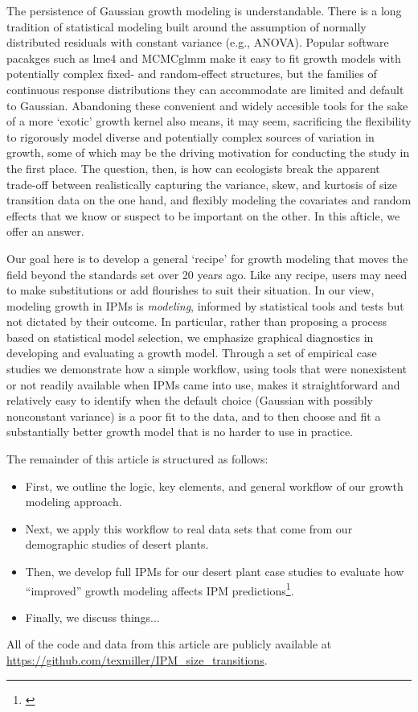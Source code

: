 \documentclass[11pt]{article}
\newcommand{\tom}[2]{{\color{red}{#1}}\footnote{\textit{\color{red}{#2}}}}
\begin{document}
{The persistence of Gaussian growth modeling is understandable. 
There is a long tradition of statistical modeling built around the assumption of normally distributed residuals with constant variance (e.g., ANOVA).
Popular software pacakges such as lme4 \citep{bates2007lme4} and MCMCglmm \citep{hadfield2010mcmc} make it easy to fit growth models with potentially complex fixed- and random-effect structures, but the families of continuous response distributions they can accommodate are limited and default to Gaussian.
Abandoning these convenient and widely accesible tools for the sake of a more `exotic' growth kernel also means, it may seem, sacrificing the flexibility to rigorously model diverse and potentially complex sources of variation in growth, some of which may be the driving motivation for conducting the study in the first place.
The question, then, is how can ecologists break the apparent trade-off between realistically capturing the variance, skew, and kurtosis of size transition data on the one hand, and flexibly modeling the covariates and random effects that we know or suspect to be important on the other. 
In this afticle, we offer an answer. 

Our goal here is to develop a general `recipe' for growth modeling that moves the field beyond the standards set over 20 years ago.
Like any recipe, users may need to make substitutions or add flourishes to suit their situation. 
In our view, modeling growth in IPMs is \emph{modeling}, informed by statistical tools and tests but not dictated by their outcome. 
In particular, rather than proposing a process based on statistical model selection, we emphasize graphical diagnostics in developing and 
evaluating a growth model. Through a set of empirical case studies we demonstrate how a simple workflow, using tools 
that were nonexistent or not readily available when IPMs came into use, makes it straightforward and relatively 
easy to identify when the default choice (Gaussian with possibly nonconstant variance) is a poor fit to the data, 
and to then choose and fit a substantially better growth model that is no harder to use in practice. 

The remainder of this article is structured as follows:
\begin{itemize}
\item First, we outline the logic, key elements, and general workflow of our growth modeling approach.
\item Next, we apply this workflow to real data sets that come from our demographic studies of desert plants.
\item Then, we develop full IPMs for our desert plant case studies to evaluate how ``improved'' growth modeling affects IPM predictions\tom{}{I am still interested in possibly doing a simulation study to ask if there are particular types of life histories where getting the tails of size transitions right matters more or less. But punting that for now.}. 
\item Finally, we discuss things...
\end{itemize}
All of the code and data from this article are publicly available at \url{https://github.com/texmiller/IPM_size_transitions}.

}
\end{document}
